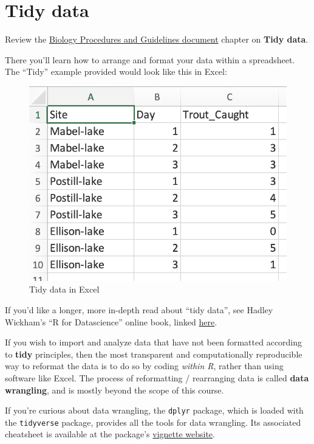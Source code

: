 \documentclass[
]{book}
\begin{document}
\section{Tidy data}\label{tidy_data}

Review the \href{https://ubco-biology.github.io/Procedures-and-Guidelines/tidy-data.html}{Biology Procedures and Guidelines document} chapter on \textbf{Tidy data}.

There you'll learn how to arrange and format your data within a spreadsheet. The ``Tidy'' example provided would look like this in Excel:

\begin{figure}
\includegraphics[width=10.75in]{./more/excel_tidy} \caption{Tidy data in Excel}\label{fig:exceltidy}
\end{figure}

If you'd like a longer, more in-depth read about ``tidy data'', see Hadley Wickham's ``R for Datascience'' online book, linked \href{http://r4ds.had.co.nz/tidy-data.html}{here}.

If you wish to import and analyze data that have not been formatted according to \textbf{tidy} principles, then the most transparent and computationally reproducible way to reformat the data is to do so by coding \emph{within R}, rather than using software like Excel. The process of reformatting / rearranging data is called \textbf{data wrangling}, and is mostly beyond the scope of this course.

If you're curious about data wrangling, the \texttt{dplyr} package, which is loaded with the \texttt{tidyverse} package, provides all the tools for data wrangling. Its associated cheatsheet is available at the package's \href{https://dplyr.tidyverse.org/index.html}{vignette website}.
\end{document}
